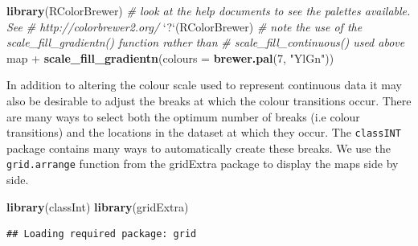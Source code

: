\documentclass[]{article}
\newenvironment{Shaded}{}{}
\newcommand{\KeywordTok}[1]{\textcolor[rgb]{0.00,0.44,0.13}{\textbf{{#1}}}}
\newcommand{\DataTypeTok}[1]{\textcolor[rgb]{0.56,0.13,0.00}{{#1}}}
\newcommand{\DecValTok}[1]{\textcolor[rgb]{0.25,0.63,0.44}{{#1}}}
\newcommand{\StringTok}[1]{\textcolor[rgb]{0.25,0.44,0.63}{{#1}}}
\newcommand{\CommentTok}[1]{\textcolor[rgb]{0.38,0.63,0.69}{\textit{{#1}}}}
\newcommand{\NormalTok}[1]{{#1}}
\begin{document}
\begin{Shaded}
\begin{Highlighting}[]
\KeywordTok{library}\NormalTok{(RColorBrewer)}
\CommentTok{# look at the help documents to see the palettes available. See}
\CommentTok{# http://colorbrewer2.org/}
\StringTok{`}\DataTypeTok{?}\StringTok{`}\NormalTok{(RColorBrewer)}
\CommentTok{# note the use of the scale_fill_gradientn() function rather than}
\CommentTok{# scale_fill_continuous() used above}
\NormalTok{map + }\KeywordTok{scale_fill_gradientn}\NormalTok{(}\DataTypeTok{colours =} \KeywordTok{brewer.pal}\NormalTok{(}\DecValTok{7}\NormalTok{, }\StringTok{"YlGn"}\NormalTok{))}
\end{Highlighting}
\end{Shaded}

In addition to altering the colour scale used to represent continuous
data it may also be desirable to adjust the breaks at which the colour
transitions occur. There are many ways to select both the optimum number
of breaks (i.e colour transitions) and the locations in the dataset at
which they occur. The \texttt{classINT} package contains many ways to
automatically create these breaks. We use the \texttt{grid.arrange}
function from the gridExtra package to display the maps side by side.

\begin{Shaded}
\begin{Highlighting}[]
\KeywordTok{library}\NormalTok{(classInt)}
\KeywordTok{library}\NormalTok{(gridExtra)}
\end{Highlighting}
\end{Shaded}

\begin{verbatim}
## Loading required package: grid
\end{verbatim}

\begin{Shaded}
\end{Shaded}
\end{document}
